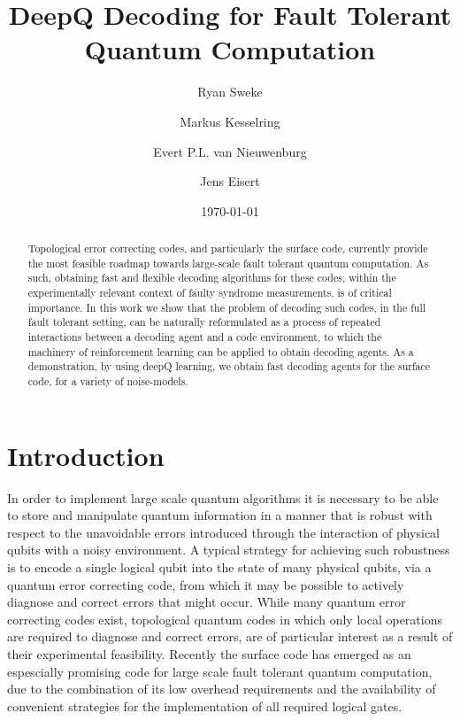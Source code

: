 \documentclass[onecolumn,preprintnumbers,amsmath,amssymb,notitlepage,nofootinbib,longbibliography,superscriptaddress]{revtex4-1}
\begin{document}
\title{DeepQ Decoding for Fault Tolerant Quantum Computation}

\author{Ryan Sweke}
\author{Markus Kesselring}
\author{Evert P.L. van Nieuwenburg}
\author{Jens Eisert}


\date{\today}


\begin{abstract}
Topological error correcting codes, and particularly the surface code, currently provide the most feasible roadmap towards large-scale fault tolerant quantum computation. As such, obtaining fast and flexible decoding algorithms for these codes, within the experimentally relevant context of faulty syndrome measurements, is of critical importance. In this work we show that the problem of decoding such codes, in the full fault tolerant setting, can be naturally reformulated as a process of repeated interactions between a decoding agent and a code environment, to which the machinery of reinforcement learning can be applied to obtain decoding agents. As a demonstration, by using deepQ learning, we obtain fast decoding agents for the surface code, for a variety of noise-models.
\end{abstract}

\maketitle
 
 
\section{Introduction}\label{s:introduction}

In order to implement large scale quantum algorithms it is necessary to be able to store and manipulate quantum information in a manner that is robust with respect to the unavoidable errors introduced through the interaction of physical qubits with a noisy environment. A typical strategy for achieving such robustness is to encode a single logical qubit into the state of many physical qubits, via a quantum error correcting code, from which it may be possible to actively diagnose and correct errors that might occur. While many quantum error correcting codes exist, topological quantum codes in which only local operations are required to diagnose and correct errors, are of particular interest as a result of their experimental feasibility. Recently the surface code has emerged as an espescially promising code for large scale fault tolerant quantum computation, due to the combination of its low overhead requirements and the availability of convenient strategies for the implementation of all required logical gates.
\end{document}
